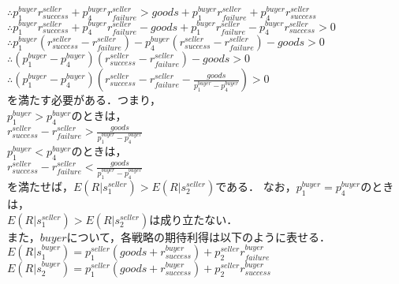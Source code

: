  $\therefore p^{buyer}_1 {r}^{seller}_{success} +  p^{buyer}_4 r^{seller}_{failure} > goods + p^{buyer}_1 r^{seller}_{failure} + p^{buyer}_4 r^{seller}_{success}$ \\

$\therefore p^{buyer}_1 {r}^{seller}_{success} +  p^{buyer}_4 r^{seller}_{failure} - goods + p^{buyer}_1 r^{seller}_{failure} - p^{buyer}_4 r^{seller}_{success} > 0$ \\

$\therefore p^{buyer}_1(r^{seller}_{success} - r^{seller}_{failure}) - p^{buyer}_4(r^{seller}_{success} - r^{seller}_{failure} ) - goods > 0$ \\

$\therefore (p^{buyer}_1 - p^{buyer}_4)(r^{seller}_{success} - r^{seller}_{failure}) - goods> 0$ \\

$\therefore (p^{buyer}_1 - p^{buyer}_4)(r^{seller}_{success} - r^{seller}_{failure} - \frac{ goods }{p^{buyer}_1 - p^{buyer}_4})> 0$ \\
を満たす必要がある．つまり，\\

$ p^{buyer}_1>p^{buyer}_4$のときは， \\

$ r^{seller}_{success} - r^{seller}_{failure} > \frac{ goods }{p^{buyer}_1 - p^{buyer}_4}$\\

$ p^{buyer}_1 < p^{buyer}_4$のときは，\\

$ r^{seller}_{success} - r^{seller}_{failure} < \frac{ goods }{p^{buyer}_1 - p^{buyer}_4}$\\

を満たせば，$E(R |s^{seller}_1) > E(R |s^{seller}_2)$である．
なお，$ p^{buyer}_1 = p^{buyer}_4$のときは，\\

$E(R |s^{seller}_1) > E(R |s^{seller}_2)$は成り立たない．\\

また，$ {buyer}$について，各戦略の期待利得は以下のように表せる．\\

$ E(R|s^{buyer}_1) = p^{seller}_1 (goods + r^{buyer}_{success}) + p^{seller}_2 r^{buyer}_{failure}$ \\

$ E(R|s^{buyer}_2)=p^{seller}_1 (goods + r^{buyer}_{success}) + p^{seller}_2 r^{buyer}_{success}$ \\

